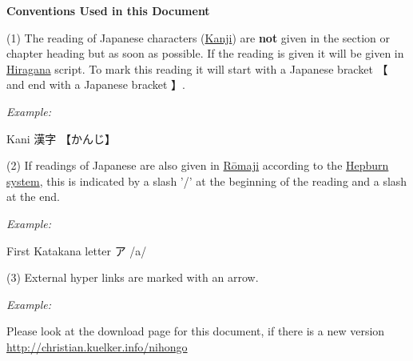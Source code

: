 \bigskip

\textbf{Conventions Used in this Document}

\bigskip

(1) The reading of Japanese characters (\hyperref[sec:Kanji]{Kanji}) are
\textbf{not} given in the section or chapter heading but as soon as possible.
If the reading is given it will be given in \hyperref[sec:Hiragana]{Hiragana}
script. To mark this reading it will start with a Japanese bracket {【} and end
with a Japanese bracket {】}.

\bigskip
\textit{Example:}

\bigskip
\begin{center}
     Kani {漢字} {【かんじ】}
\end{center}

\bigskip

(2) If readings of Japanese are also given in \hyperref[sec:Romaji]{Rōmaji}
according to the \hyperref[sec:Hepburn]{Hepburn system}, this is indicated by a
slash '/' at the beginning of the reading and a slash at the end.

\bigskip
\textit{Example:}

\bigskip
\begin{center}
     First Katakana letter {ア} {/a/}
\end{center}

\bigskip

(3) External hyper links are marked with an arrow.

\bigskip
\textit{Example:}

\bigskip
\begin{center}
     Please look at the download page for this document, if there is a new
     version\\ \Link
     \href{http://christian.kuelker.info/nihongo}{http://christian.kuelker.info/nihongo}
\end{center}

